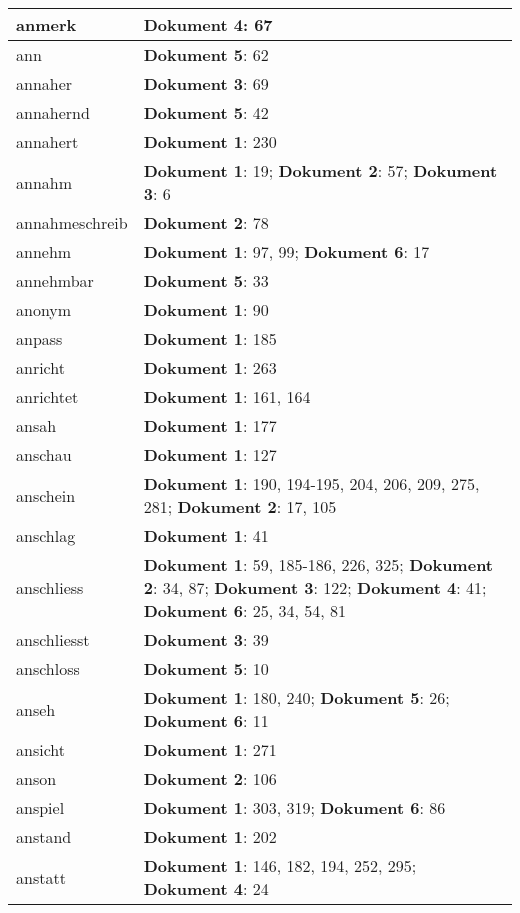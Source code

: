 \documentclass[a5paper]{article}
\begin{document}
\begin{longtable}[l]{|l|p{3in}|}
\hline
anmerk & \textbf{Dokument 4}: 67 \\
\hline
ann & \textbf{Dokument 5}: 62 \\
\hline
annaher & \textbf{Dokument 3}: 69 \\
\hline
annahernd & \textbf{Dokument 5}: 42 \\
\hline
annahert & \textbf{Dokument 1}: 230 \\
\hline
annahm & \textbf{Dokument 1}: 19; \textbf{Dokument 2}: 57; \textbf{Dokument 3}: 6 \\
\hline
annahmeschreib & \textbf{Dokument 2}: 78 \\
\hline
annehm & \textbf{Dokument 1}: 97, 99; \textbf{Dokument 6}: 17 \\
\hline
annehmbar & \textbf{Dokument 5}: 33 \\
\hline
anonym & \textbf{Dokument 1}: 90 \\
\hline
anpass & \textbf{Dokument 1}: 185 \\
\hline
anricht & \textbf{Dokument 1}: 263 \\
\hline
anrichtet & \textbf{Dokument 1}: 161, 164 \\
\hline
ansah & \textbf{Dokument 1}: 177 \\
\hline
anschau & \textbf{Dokument 1}: 127 \\
\hline
anschein & \textbf{Dokument 1}: 190, 194-195, 204, 206, 209, 275, 281; \textbf{Dokument 2}: 17, 105 \\
\hline
anschlag & \textbf{Dokument 1}: 41 \\
\hline
anschliess & \textbf{Dokument 1}: 59, 185-186, 226, 325; \textbf{Dokument 2}: 34, 87; \textbf{Dokument 3}: 122; \textbf{Dokument 4}: 41; \textbf{Dokument 6}: 25, 34, 54, 81 \\
\hline
anschliesst & \textbf{Dokument 3}: 39 \\
\hline
anschloss & \textbf{Dokument 5}: 10 \\
\hline
anseh & \textbf{Dokument 1}: 180, 240; \textbf{Dokument 5}: 26; \textbf{Dokument 6}: 11 \\
\hline
ansicht & \textbf{Dokument 1}: 271 \\
\hline
anson & \textbf{Dokument 2}: 106 \\
\hline
anspiel & \textbf{Dokument 1}: 303, 319; \textbf{Dokument 6}: 86 \\
\hline
anstand & \textbf{Dokument 1}: 202 \\
\hline
anstatt & \textbf{Dokument 1}: 146, 182, 194, 252, 295; \textbf{Dokument 4}: 24 \\

\end{longtable}
\end{document}

